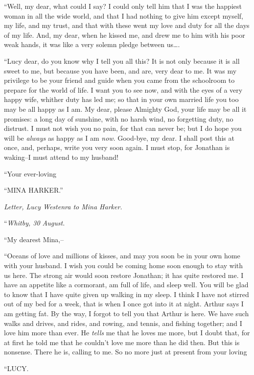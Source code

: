 \documentclass[12pt,openright]{book}
\begin{document}
“Well, my dear, what could I say? I could only tell him that I was the happiest woman in all the wide world, and that I had nothing to give him except myself, my life, and my trust, and that with these went my love and duty for all the days of my life. And, my dear, when he kissed me, and drew me to him with his poor weak hands, it was like a very solemn pledge between us….

“Lucy dear, do you know why I tell you all this? It is not only because it is all sweet to me, but because you have been, and are, very dear to me. It was my privilege to be your friend and guide when you came from the schoolroom to prepare for the world of life. I want you to see now, and with the eyes of a very happy wife, whither duty has led me; so that in your own married life you too may be all happy as I am. My dear, please Almighty God, your life may be all it promises: a long day of sunshine, with no harsh wind, no forgetting duty, no distrust. I must not wish you no pain, for that can never be; but I do hope you will be \textit{always} as happy as I am \textit{now}. Good-bye, my dear. I shall post this at once, and, perhaps, write you very soon again. I must stop, for Jonathan is waking–I must attend to my husband!

“Your ever-loving

“MINA HARKER.”

\textit{Letter, Lucy Westenra to Mina Harker.}

“\textit{Whitby, 30 August.}

“My dearest Mina,–

“Oceans of love and millions of kisses, and may you soon be in your own home with your husband. I wish you could be coming home soon enough to stay with us here. The strong air would soon restore Jonathan; it has quite restored me. I have an appetite like a cormorant, am full of life, and sleep well. You will be glad to know that I have quite given up walking in my sleep. I think I have not stirred out of my bed for a week, that is when I once got into it at night. Arthur says I am getting fat. By the way, I forgot to tell you that Arthur is here. We have such walks and drives, and rides, and rowing, and tennis, and fishing together; and I love him more than ever. He \textit{tells} me that he loves me more, but I doubt that, for at first he told me that he couldn’t love me more than he did then. But this is nonsense. There he is, calling to me. So no more just at present from your loving

“LUCY.
\end{document}
